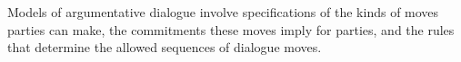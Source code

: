 \documentclass[10pt]{article}
\begin{document}
\noindent Models of argumentative dialogue involve specifications of the kinds of moves parties can make, the commitments these moves imply for parties, and the rules that determine the allowed sequences of dialogue moves.

\end{document}
